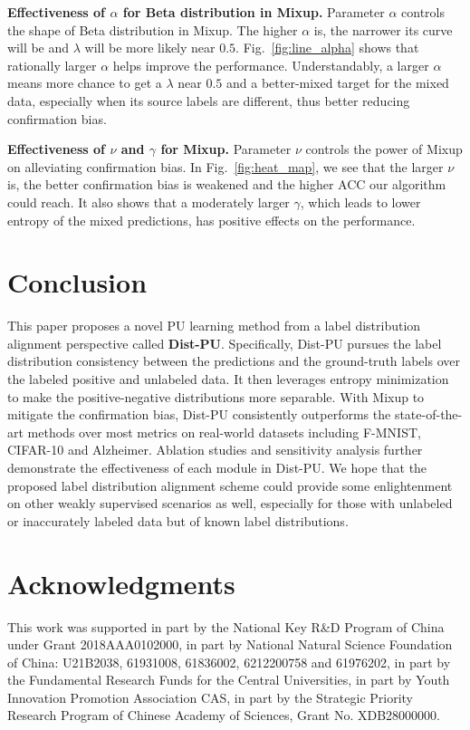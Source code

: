 \documentclass[final]{cvpr}
\newcommand{\bangyan}[1]{#1}
\begin{document}
\textbf{Effectiveness of $\alpha$ for Beta distribution in Mixup.} Parameter $\alpha$ controls the shape of Beta distribution in Mixup. The higher $\alpha$ is, the narrower its curve will be and $\lambda$ will be more likely near $0.5$. Fig.~\ref{fig:line_alpha} shows that rationally larger $\alpha$ helps improve the performance. Understandably, a larger $\alpha$ means more chance to get a $\lambda$ near $0.5$ and a better-mixed target for the mixed data, especially when its source labels are different, thus better reducing confirmation bias.

\textbf{Effectiveness of $\nu$ and $\gamma$ for Mixup.} Parameter $\nu$ controls the power of Mixup on alleviating confirmation bias. In Fig.~\ref{fig:heat_map}, we see that the larger $\nu$ is, the better confirmation bias is weakened and the higher ACC our algorithm could reach. It also shows that a moderately larger $\gamma$, which leads to lower entropy of the mixed predictions, has positive effects on the performance.%


\section{Conclusion}
This paper proposes \bangyan{a novel PU learning method from a label distribution alignment perspective called \textbf{Dist-PU}}. Specifically, Dist-PU pursues the label distribution consistency between the predictions and the ground-truth labels over the labeled positive and unlabeled data. It then leverages entropy minimization to make the positive-negative distributions more separable. With Mixup to mitigate the confirmation bias, Dist-PU consistently outperforms the state-of-the-art methods over most metrics on real-world datasets including F-MNIST, CIFAR-10 and Alzheimer. Ablation studies and sensitivity analysis further demonstrate the effectiveness of each module in Dist-PU. We hope that the proposed label distribution alignment scheme could provide some enlightenment on other weakly supervised scenarios as well, especially for those with unlabeled or inaccurately labeled data but of known label distributions.

\section*{Acknowledgments}
This work was supported in part by the National Key R\&D Program of China under Grant 2018AAA0102000, in part by National Natural Science Foundation of China: U21B2038, 61931008, 61836002, 6212200758 and 61976202, in part by the Fundamental Research Funds for the Central Universities, in part by Youth Innovation Promotion Association CAS, in part by the Strategic Priority Research Program of Chinese Academy of Sciences, Grant No. XDB28000000.

{\small


}
\end{document}
